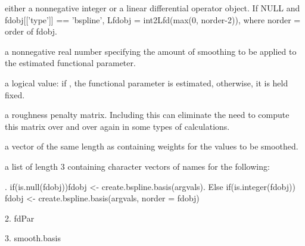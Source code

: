 \documentclass{article}
\begin{document}
\begin{Arguments}
\begin{ldescription}
{}

\item[\code{Lfdobj}] either a nonnegative integer or a linear differential operator
object.  If NULL and fdobj[['type']] == 'bspline', Lfdobj =
int2Lfd(max(0, norder-2)), where norder = order of fdobj.   

\item[\code{lambda}] a nonnegative real number specifying the amount of smoothing
to be applied to the estimated functional parameter.

\item[\code{estimate}] a logical value:  if , the functional parameter is
estimated, otherwise, it is held fixed.

\item[\code{penmat}] a roughness penalty matrix.  Including this can eliminate the need
to compute this matrix over and over again in some types of
calculations.

\item[\code{wtvec}] a vector of the same length as  containing weights for
the values to be smoothed. 

\item[\code{fdnames}] a list of length 3 containing character vectors of names for the
following: 


\end{ldescription}
\end{Arguments}
\begin{Details}.  if(is.null(fdobj))fdobj <- create.bspline.basis(argvals).  Else
if(is.integer(fdobj)) fdobj <- create.bspline.basis(argvals, norder =
fdobj) 

2.  fdPar

3.  smooth.basis
\end{Details}
\end{document}
